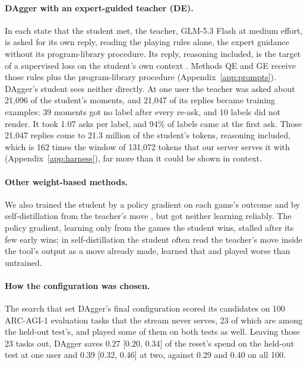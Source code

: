 \paragraph{DAgger with an expert-guided teacher (DE).}
In each state that the student met, the teacher, GLM-5.3 Flash at medium effort, is asked for its own reply, reading the playing rules alone, the expert guidance without its program-library procedure. Its reply, reasoning included, is the target of a supervised loss on the student's own context \citep{ross2011dagger}. Methods QE and GE receive those rules plus the program-library procedure (Appendix~\ref{app:prompts}). DAgger's student sees neither directly. At one user the teacher was asked about 21,096 of the student's moments, and 21,047 of its replies became training examples: 39 moments got no label after every re-ask, and 10 labels did not render. It took 1.07 asks per label, and 94\% of labels came at the first ask. Those 21,047 replies come to 21.3 million of the student's tokens, reasoning included, which is 162 times the window of 131{,}072 tokens that our server serves it with (Appendix~\ref{app:harness}), far more than it could be shown in context.

\paragraph{Other weight-based methods.}
\label{app:other-weights}
We also trained the student by a policy gradient on each game's outcome \citep{schulman2017ppo} and by self-distillation from the teacher's move \citep{shenfeld2026sdft}, but got neither learning reliably. The policy gradient, learning only from the games the student wins, stalled after its few early wins; in self-distillation the student often read the teacher's move inside the tool's output as a move already made, learned that and played worse than untrained.

\paragraph{How the configuration was chosen.} The search that set DAgger's final configuration scored its candidates on 100 ARC-AGI-1 evaluation tasks that the stream never serves, 23 of which are among the held-out test's, and played some of them on both tests as well. Leaving those 23 tasks out, DAgger saves 0.27 [0.20, 0.34] of the reset's spend on the held-out test at one user and 0.39 [0.32, 0.46] at two, against 0.29 and 0.40 on all 100.


